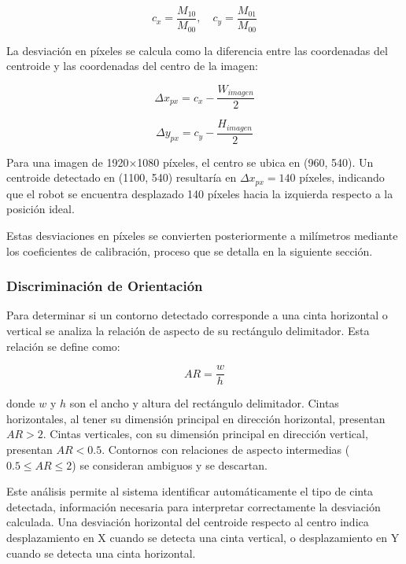 \begin{equation}
c_x = \frac{M_{10}}{M_{00}}, \quad c_y = \frac{M_{01}}{M_{00}}
\end{equation}

La desviación en píxeles se calcula como la diferencia entre las coordenadas del centroide y las coordenadas del centro de la imagen:

\begin{equation}
\Delta x_{px} = c_x - \frac{W_{imagen}}{2}
\end{equation}

\begin{equation}
\Delta y_{px} = c_y - \frac{H_{imagen}}{2}
\end{equation}

Para una imagen de 1920×1080 píxeles, el centro se ubica en (960, 540). Un centroide detectado en (1100, 540) resultaría en $\Delta x_{px} = 140$ píxeles, indicando que el robot se encuentra desplazado 140 píxeles hacia la izquierda respecto a la posición ideal.

Estas desviaciones en píxeles se convierten posteriormente a milímetros mediante los coeficientes de calibración, proceso que se detalla en la siguiente sección.

\subsubsection{Discriminación de Orientación}

Para determinar si un contorno detectado corresponde a una cinta horizontal o vertical se analiza la relación de aspecto de su rectángulo delimitador. Esta relación se define como:

\begin{equation}
AR = \frac{w}{h}
\end{equation}

donde $w$ y $h$ son el ancho y altura del rectángulo delimitador. Cintas horizontales, al tener su dimensión principal en dirección horizontal, presentan $AR > 2$. Cintas verticales, con su dimensión principal en dirección vertical, presentan $AR < 0.5$. Contornos con relaciones de aspecto intermedias ($0.5 \leq AR \leq 2$) se consideran ambiguos y se descartan.

Este análisis permite al sistema identificar automáticamente el tipo de cinta detectada, información necesaria para interpretar correctamente la desviación calculada. Una desviación horizontal del centroide respecto al centro indica desplazamiento en X cuando se detecta una cinta vertical, o desplazamiento en Y cuando se detecta una cinta horizontal.

